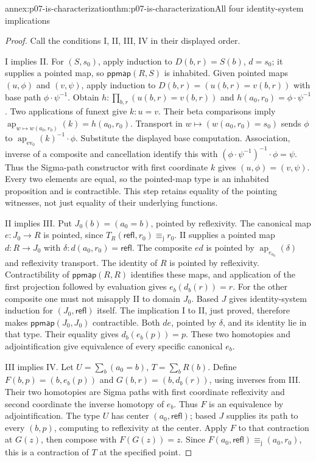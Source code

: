 \begin{annexitem}{annex:p07-is-characterization}{thm:p07-is-characterization}{All four identity-system implications}
\begin{proof}
Call the conditions I, II, III, IV in their displayed order.

I implies II. For \((S,s_0)\), apply induction to
\(D(b,r)=S(b)\), \(d=s_0\); it supplies a pointed map, so
\(\mathsf{ppmap}(R,S)\) is inhabited. Given pointed maps
\((u,\phi)\) and \((v,\psi)\), apply induction to
\(D(b,r)=(u(b,r)=v(b,r))\) with base path
\(\phi\cdot\psi^{-1}\). Obtain
\(h:\prod_{b,r}(u(b,r)=v(b,r))\) and
\(h(a_0,r_0)=\phi\cdot\psi^{-1}\).
Two applications of funext give \(k:u=v\).
Their beta comparisons imply
\(\operatorname{ap}_{w\mapsto w(a_0,r_0)}(k)=h(a_0,r_0)\).
Transport in \(w\mapsto(w(a_0,r_0)=s_0)\) sends \(\phi\) to
\(\operatorname{ap}_{\mathrm{ev}_0}(k)^{-1}\cdot\phi\).
Substitute the displayed base computation. Association, inverse of
a composite and cancellation identify this with
\((\phi\cdot\psi^{-1})^{-1}\cdot\phi=\psi\).
Thus the Sigma-path constructor with first coordinate \(k\)
gives \((u,\phi)=(v,\psi)\). Every two elements are equal, so
the pointed-map type is an inhabited proposition and is contractible.
This step retains equality of the pointing witnesses, not just equality
of their underlying functions.

II implies III. Put \(J_0(b)=(a_0=b)\), pointed by reflexivity.
The canonical map \(e:J_0\to R\) is pointed, since
\(T_R(\mathsf{refl},r_0)\equiv_{\mathrm j}r_0\).
II supplies a pointed map \(d:R\to J_0\) with
\(\delta:d(a_0,r_0)=\mathsf{refl}\).
The composite \(ed\) is pointed by
\(\operatorname{ap}_{e_{a_0}}(\delta)\) and reflexivity transport.
The identity of \(R\) is pointed by reflexivity.
Contractibility of \(\mathsf{ppmap}(R,R)\) identifies these maps,
and application of the first projection followed by evaluation
gives \(e_b(d_b(r))=r\).
For the other composite one must not misapply II to domain \(J_0\).
Based \(J\) gives identity-system induction for
\((J_0,\mathsf{refl})\) itself. The implication I to II, just proved,
therefore makes \(\mathsf{ppmap}(J_0,J_0)\) contractible.
Both \(de\), pointed by \(\delta\), and its identity lie in that
type. Their equality gives \(d_b(e_b(p))=p\).
These two homotopies and adjointification give equivalence of every
specific canonical \(e_b\).

III implies IV. Let
\(U=\sum_b(a_0=b)\), \(T=\sum_bR(b)\).
Define \(F(b,p)=(b,e_b(p))\) and
\(G(b,r)=(b,d_b(r))\), using inverses from III.
Their two homotopies are Sigma paths with first coordinate reflexivity
and second coordinate the inverse homotopy of \(e_b\).
Thus \(F\) is an equivalence by adjointification.
The type \(U\) has center \((a_0,\mathsf{refl})\);
based \(J\) supplies its path to every \((b,p)\), computing to
reflexivity at the center. Apply \(F\) to that contraction at
\(G(z)\), then compose with \(F(G(z))=z\).
Since \(F(a_0,\mathsf{refl})\equiv_{\mathrm j}(a_0,r_0)\),
this is a contraction of \(T\) at the specified point.


\end{proof}
\end{annexitem}

